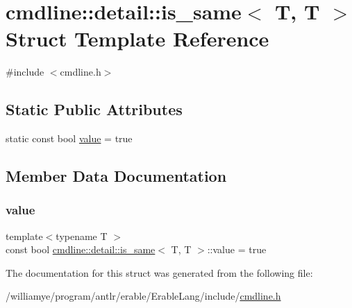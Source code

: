 \hypertarget{structcmdline_1_1detail_1_1is__same_3_01_t_00_01_t_01_4}{}\section{cmdline\+::detail\+::is\+\_\+same$<$ T, T $>$ Struct Template Reference}
\label{structcmdline_1_1detail_1_1is__same_3_01_t_00_01_t_01_4}


{\ttfamily \#include $<$cmdline.\+h$>$}

\subsection*{Static Public Attributes}
\begin{DoxyCompactItemize}
\item 
static const bool \mbox{\hyperlink{structcmdline_1_1detail_1_1is__same_3_01_t_00_01_t_01_4_a5640f6fc005b679b1e051f7e050205e5}{value}} = true
\end{DoxyCompactItemize}


\subsection{Member Data Documentation}
\mbox{\label{structcmdline_1_1detail_1_1is__same_3_01_t_00_01_t_01_4_a5640f6fc005b679b1e051f7e050205e5}} 
\subsubsection{\texorpdfstring{value}{value}}
{\footnotesize\ttfamily template$<$typename T $>$ \\
const bool \mbox{\hyperlink{structcmdline_1_1detail_1_1is__same}{cmdline\+::detail\+::is\+\_\+same}}$<$ T, T $>$\+::value = true\hspace{0.3cm}{\ttfamily [static]}}



The documentation for this struct was generated from the following file\+:\begin{DoxyCompactItemize}
\item 
/williamye/program/antlr/erable/\+Erable\+Lang/include/\mbox{\hyperlink{cmdline_8h}{cmdline.\+h}}\end{DoxyCompactItemize}
